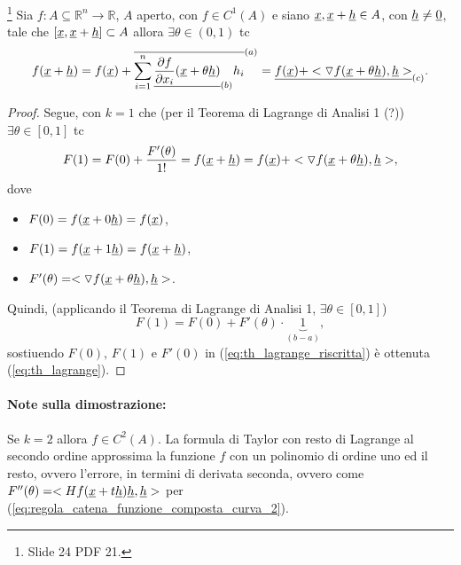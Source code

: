 \begin{theorem}[Lagrange]\label{th:di_lagrange}\footnote{Slide 24 PDF 21.}
	Sia $f:A\subseteq\mathbb{R}^n\rightarrow\mathbb{R}$, $A$ aperto, con $f\in C^1(A)$ e siano $\uline x, \uline x+\uline h\in A$, con $\uline h\neq\uline 0$, tale che $[\uline x, \uline x+\uline h] \subset A$ allora $\exists\theta\in(0,1)$ tc
	\begin{equation}\label{eq:th_lagrange}
		f(\uline x+\uline h) = f(\uline x) + \overline{\sum_{i = 1}^{n} \underline{\frac{\partial f}{\partial x_i} (\uline x + \theta \uline h)}_{(b)} h_i }^{(a)} = \uline{f(\uline x) + <\triangledown f(\uline x + \theta \uline h), \uline h>}_{(c)}.
	\end{equation}
\end{theorem}

\begin{proof}
	Segue, con $k=1$ che (per il Teorema di Lagrange di Analisi 1 (?)) $\exists\theta\in[0,1]$ tc
	\begin{equation}\label{eq:th_lagrange_riscritta}
		F(1) = F(0) + \frac{F'(\theta)}{1!} = f(\uline x +\uline h) = f(\uline x) + <\triangledown f(\uline x + \theta \uline h), \uline h>,
	\end{equation}
	dove
	\begin{itemize}
		\item $F(0)= f(\uline x + 0\uline h) = f(\uline x)$,
		\item $F(1)=f(\uline x+1 \uline h)=f(\uline x+\uline h)$,
		\item $F'(\theta) = <\triangledown f(\uline x + \theta \uline h), \uline h>$.
	\end{itemize}
	Quindi, (applicando il Teorema di Lagrange di Analisi 1, $\exists\theta\in[0,1]$)
	\begin{equation}\label{eq:incremento_variabili_dim_lagrange}
		F(1) = F(0) + F'(\theta) \cdot \underbrace{1}_{(b-a)},
	\end{equation}
	sostiuendo $F(0),\, F(1)$ e $F'(0)$ in (\ref{eq:th_lagrange_riscritta}) è ottenuta (\ref{eq:th_lagrange}).
\end{proof}

\paragraph{Note sulla dimostrazione:} Se $k=2$ allora $f\in C^2(A)$. La formula di Taylor con resto di Lagrange al secondo ordine approssima la funzione $f$ con un polinomio di ordine uno ed il resto, ovvero l'errore, in termini di derivata seconda, ovvero come $F''(\theta) = <Hf(\uline x + t\uline h)\uline h, \uline h>$ per (\ref{eq:regola_catena_funzione_composta_curva_2}).

